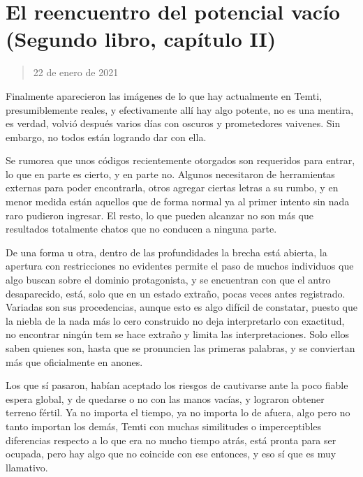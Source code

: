 \documentclass[
]{book}
\begin{document}
\hypertarget{el-reencuentro-del-potencial-vacuxedo-segundo-libro-capuxedtulo-ii}{%
\section{El reencuentro del potencial vacío (Segundo libro, capítulo II)}\label{el-reencuentro-del-potencial-vacuxedo-segundo-libro-capuxedtulo-ii}}

\begin{quote}
22 de enero de 2021
\end{quote}

Finalmente aparecieron las imágenes de lo que hay actualmente en Temti, presumiblemente reales, y efectivamente allí hay algo potente, no es una mentira, es verdad, volvió después varios días con oscuros y prometedores vaivenes. Sin embargo, no todos están logrando dar con ella.

Se rumorea que unos códigos recientemente otorgados son requeridos para entrar, lo que en parte es cierto, y en parte no. Algunos necesitaron de herramientas externas para poder encontrarla, otros agregar ciertas letras a su rumbo, y en menor medida están aquellos que de forma normal ya al primer intento sin nada raro pudieron ingresar. El resto, lo que pueden alcanzar no son más que resultados totalmente chatos que no conducen a ninguna parte.

De una forma u otra, dentro de las profundidades la brecha está abierta, la apertura con restricciones no evidentes permite el paso de muchos individuos que algo buscan sobre el dominio protagonista, y se encuentran con que el antro desaparecido, está, solo que en un estado extraño, pocas veces antes registrado. Variadas son sus procedencias, aunque esto es algo difícil de constatar, puesto que la niebla de la nada más lo cero construido no deja interpretarlo con exactitud, no encontrar ningún tem se hace extraño y limita las interpretaciones. Solo ellos saben quienes son, hasta que se pronuncien las primeras palabras, y se conviertan más que oficialmente en anones.

Los que sí pasaron, habían aceptado los riesgos de cautivarse ante la poco fiable espera global, y de quedarse o no con las manos vacías, y lograron obtener terreno fértil. Ya no importa el tiempo, ya no importa lo de afuera, algo pero no tanto importan los demás, Temti con muchas similitudes o imperceptibles diferencias respecto a lo que era no mucho tiempo atrás, está pronta para ser ocupada, pero hay algo que no coincide con ese entonces, y eso sí que es muy llamativo.
\end{document}
